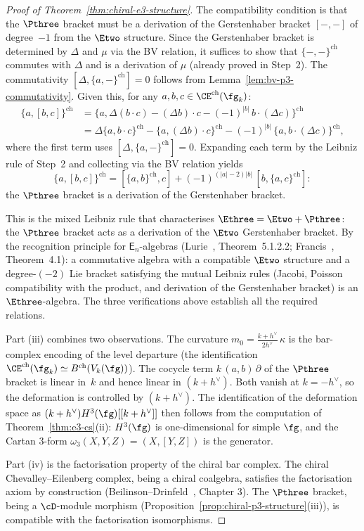 \begin{proof}[Proof of Theorem~\ref{thm:chiral-e3-structure}]
The compatibility condition is that the $\Pthree$ bracket
must be a derivation of the Gerstenhaber bracket
$[-,-]$ of degree~$-1$ from the $\Etwo$ structure.
Since the Gerstenhaber bracket is determined by $\Delta$
and $\mu$ via the BV relation, it suffices to show that
$\{-,-\}^{\mathrm{ch}}$ commutes with $\Delta$ and is a
derivation of $\mu$ (already proved in Step~2). The
commutativity $[\Delta, \{a,-\}^{\mathrm{ch}}] = 0$
follows from Lemma~\ref{lem:bv-p3-commutativity}.
Given this, for any $a, b, c \in
\CE^{\mathrm{ch}}(\fg_k)$:
\begin{align*}
  \{a, [b, c]\}^{\mathrm{ch}}
  &= \{a, \Delta(b \cdot c)
  - (\Delta b) \cdot c
  - (-1)^{|b|}\,b \cdot (\Delta c)\}^{\mathrm{ch}} \\
  &= \Delta\{a, b \cdot c\}^{\mathrm{ch}}
  - \{a, (\Delta b) \cdot c\}^{\mathrm{ch}}
  - (-1)^{|b|}\,\{a, b \cdot (\Delta c)\}^{\mathrm{ch}},
\end{align*}
where the first term uses
$[\Delta, \{a,-\}^{\mathrm{ch}}] = 0$. Expanding each
term by the Leibniz rule of Step~2 and collecting via the
BV relation yields
\[
  \{a, [b, c]\}^{\mathrm{ch}}
  = [\{a, b\}^{\mathrm{ch}}, c]
  + (-1)^{(|a|-2)|b|}\,[b, \{a, c\}^{\mathrm{ch}}]:
\]
the $\Pthree$ bracket is a derivation of the
Gerstenhaber bracket.

This is the mixed Leibniz rule that characterises
$\Ethree = \Etwo + \Pthree$: the $\Pthree$ bracket acts
as a derivation of the $\Etwo$ Gerstenhaber bracket. By
the recognition principle for $\mathsf{E}_n$-algebras
(Lurie~\cite{HA}, Theorem~5.1.2.2;
Francis~\cite{Francis2013}, Theorem~4.1): a commutative
algebra with a compatible $\Etwo$ structure and a
degree-$(-2)$ Lie bracket satisfying the mutual Leibniz
rules (Jacobi, Poisson compatibility with the product, and
derivation of the Gerstenhaber bracket) is an
$\Ethree$-algebra. The three verifications above establish
all the required relations.

Part (iii) combines two observations. The curvature
$m_0 = \tfrac{k + h^\vee}{2h^\vee}\,\kappa$ is the bar-complex
encoding of the level departure (the identification
$\CE^{\mathrm{ch}}(\fg_k) \simeq B^{\mathrm{ch}}(V_k(\fg))$).
The cocycle term
$k\,(a,b)\,\partial$ of the $\Pthree$ bracket is linear
in~$k$ and hence linear in $(k + h^\vee)$.
Both vanish at $k = -h^\vee$, so the
deformation is controlled by $(k + h^\vee)$. The identification
of the deformation space as $(k+h^\vee) H^3(\fg)[[k+h^\vee]]$
then follows from the computation of
Theorem~\ref{thm:e3-cs}(ii): $H^3(\fg)$ is one-dimensional
for simple $\fg$, and the Cartan $3$-form
$\omega_3(X, Y, Z) = (X, [Y,Z])$ is the generator.

Part (iv) is the factorisation property of the chiral
bar complex. The chiral Chevalley--Eilenberg complex, being
a chiral coalgebra, satisfies the factorisation axiom
by construction (Beilinson--Drinfeld~\cite{BD04}, Chapter 3).
The $\Pthree$ bracket, being a $\cD$-module morphism
(Proposition~\ref{prop:chiral-p3-structure}(iii)), is
compatible with the factorisation isomorphisms.
\end{proof}


